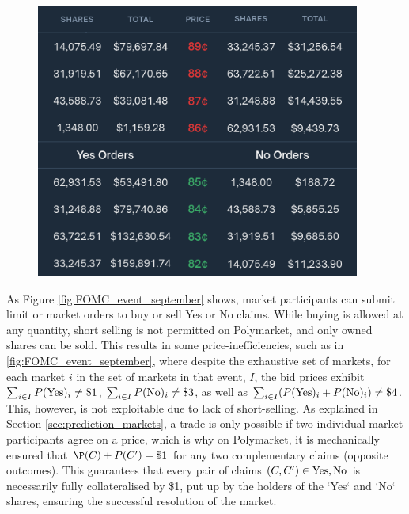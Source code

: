 \begin{figure}[H]
  \begin{center}
    \includegraphics[width=0.95\textwidth]{figures/polymarket_orderbook.png}
  \end{center}
  \label{fig:polymarket_orderbook}
\end{figure}

As Figure \ref{fig:FOMC_event_september} shows, market participants can submit limit or market orders to buy or sell Yes or No claims.
While buying is allowed at any quantity, short selling is not permitted on Polymarket, and only owned shares can be sold.
This results in some price-inefficiencies, such as in \ref{fig:FOMC_event_september}, where despite the exhaustive set of markets, for each market $i$ in the set of markets in that event, $I$, the bid prices exhibit $\sum_{i \in I} P(\text{Yes})_{i} \ne \$1$, $\sum_{i \in I} P(\text{No})_{i} \ne \$3$, as well as $\sum_{i \in I} (P(\text{Yes})_{i} + P(\text{No})_{i}) \ne \$4$. This, however, is not exploitable due to lack of short-selling.
As explained in Section \ref{sec:prediction_markets}, a trade is only possible if two individual market participants agree on a price, which is why on Polymarket, it is mechanically ensured that $\P(C) + P(C') = \$1$ for any two complementary claims (opposite outcomes).
This guarantees that every pair of claims $(C, C') \in {\text{Yes}, \text{No}}$ is necessarily fully collateralised by \$1, put up by the holders of the `Yes` and `No` shares, ensuring the successful resolution of the market. \citep{PMDocs}

